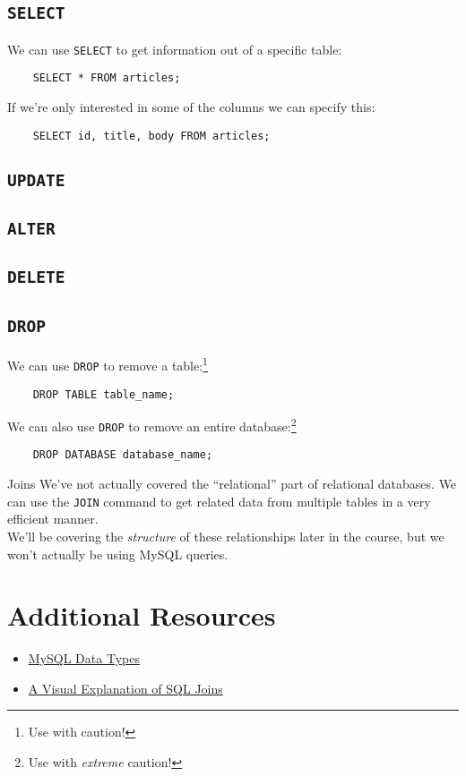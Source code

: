 \subsection{\texttt{SELECT}}

We can use \texttt{SELECT} to get information out of a specific table:

\begin{verbatim}
    SELECT * FROM articles;
\end{verbatim}

If we're only interested in some of the columns we can specify this:

\begin{verbatim}
    SELECT id, title, body FROM articles;
\end{verbatim}



\subsection{\texttt{UPDATE}}


\subsection{\texttt{ALTER}}


\subsection{\texttt{DELETE}}


\subsection{\texttt{DROP}}

We can use \texttt{DROP} to remove a table:\footnote{Use with caution!}

\begin{verbatim}
    DROP TABLE table_name;
\end{verbatim}

We can also use \texttt{DROP} to remove an entire database:\footnote{Use with \textit{extreme} caution!}

\begin{verbatim}
    DROP DATABASE database_name;
\end{verbatim}


\begin{infobox}{Joins}
    We've not actually covered the ``relational'' part of relational databases. We can use the \texttt{JOIN} command to get related data from multiple tables in a very efficient manner.
    \\

    We'll be covering the \textit{structure} of these relationships later in the course, but we won't actually be using MySQL queries.
\end{infobox}


\section{Additional Resources}

\begin{itemize}[leftmargin=*]
    \item \href{https://dev.mysql.com/doc/refman/5.7/en/data-types.html}{MySQL Data Types}
    \item \href{https://blog.codinghorror.com/a-visual-explanation-of-sql-joins/}{A Visual Explanation of SQL Joins}
\end{itemize}
